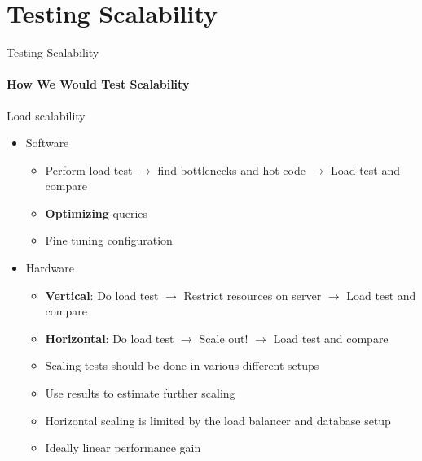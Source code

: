 \section{Testing Scalability}

\begin{frame}{Testing Scalability}
        \framesubtitle{How We Would Test Scalability}
        Load scalability
        \begin{itemize}
            \item<1-> Software
                \begin{itemize}
                    \item Perform load test $\rightarrow$ find bottlenecks and hot code $\rightarrow$ Load test and compare
                    \item \textbf{Optimizing} queries
                    \item Fine tuning configuration
                \end{itemize}
            \item<2-> Hardware
                \begin{itemize}
                    \item \textbf{Vertical}: Do load test $\rightarrow$ Restrict resources on server $\rightarrow$ Load test and compare
                    \item \textbf{Horizontal}: Do load test $\rightarrow$ Scale out! $\rightarrow$ Load test and compare
                    \item Scaling tests should be done in various different setups
                    \item Use results to estimate further scaling
                    \item Horizontal scaling is limited by the load balancer and database setup
                    \item Ideally linear performance gain
                \end{itemize}
        \end{itemize}
\end{frame}

